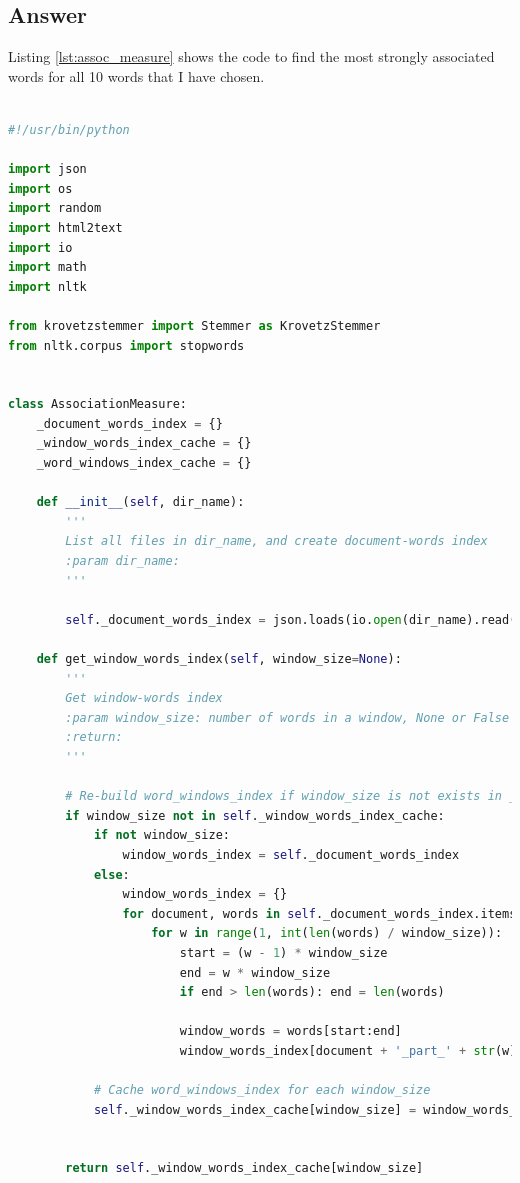\documentclass[letterpaper,11pt]{article}
\begin{document}
\subsection*{Answer}
Listing \ref{lst:assoc_measure} shows the code to find the most strongly associated words for all 10 words that I have chosen. 


\begin{lstlisting}[language=python, caption={Association Measure}, label={lst:assoc_measure}]

#!/usr/bin/python

import json
import os
import random
import html2text
import io
import math
import nltk

from krovetzstemmer import Stemmer as KrovetzStemmer
from nltk.corpus import stopwords


class AssociationMeasure:
    _document_words_index = {}
    _window_words_index_cache = {}
    _word_windows_index_cache = {}

    def __init__(self, dir_name):
        '''
        List all files in dir_name, and create document-words index
        :param dir_name:
        '''

        self._document_words_index = json.loads(io.open(dir_name).read())

    def get_window_words_index(self, window_size=None):
        '''
        Get window-words index
        :param window_size: number of words in a window, None or False if use document
        :return:
        '''

        # Re-build word_windows_index if window_size is not exists in _word_windows_index_cache
        if window_size not in self._window_words_index_cache:
            if not window_size:
                window_words_index = self._document_words_index
            else:
                window_words_index = {}
                for document, words in self._document_words_index.items():
                    for w in range(1, int(len(words) / window_size)):
                        start = (w - 1) * window_size
                        end = w * window_size
                        if end > len(words): end = len(words)

                        window_words = words[start:end]
                        window_words_index[document + '_part_' + str(w)] = window_words

            # Cache word_windows_index for each window_size
            self._window_words_index_cache[window_size] = window_words_index


        return self._window_words_index_cache[window_size]


\end{lstlisting}
\end{document}
